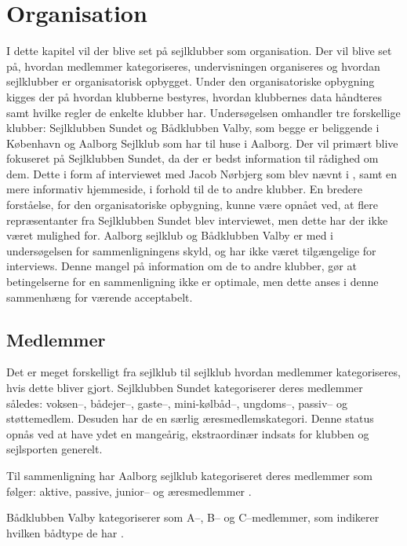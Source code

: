 \chapter{Organisation}\label{chap:organisation}

I dette kapitel vil der blive set på sejlklubber som organisation. Der vil blive set på, hvordan medlemmer
kategoriseres, undervisningen organiseres og hvordan sejlklubber er organisatorisk opbygget. Under den
organisatoriske opbygning kigges der på hvordan klubberne bestyres, hvordan klubbernes data håndteres samt
hvilke regler de enkelte klubber har. 
Undersøgelsen omhandler tre forskellige klubber: Sejlklubben Sundet og Bådklubben Valby, som begge er beliggende i København og Aalborg Sejlklub som har til huse i Aalborg. 
Der vil primært blive fokuseret på Sejlklubben Sundet,
da der er bedst information til rådighed om dem. 
Dette i form af interviewet med Jacob Nørbjerg som blev nævnt i , samt en mere informativ hjemmeside, i forhold til de to
andre klubber. 
En bredere forståelse, for den organisatoriske opbygning, kunne være opnået ved, at flere repræsentanter fra Sejlklubben Sundet blev interviewet, men dette har der ikke været mulighed for.
Aalborg sejlklub og Bådklubben Valby er med i undersøgelsen for sammenligningens skyld, og har
ikke været tilgængelige for interviews. 
Denne mangel på information om de to andre klubber, gør at betingelserne for en sammenligning ikke er optimale, men dette anses i denne sammenhæng for værende acceptabelt. 

\section{Medlemmer}\label{sec:organisation-medlemmer}

Det er meget forskelligt fra sejlklub til sejlklub hvordan medlemmer kategoriseres, hvis dette bliver gjort.
Sejlklubben Sundet kategoriserer deres medlemmer således: voksen--, bådejer--, gaste--, mini-kølbåd--,
ungdoms--, passiv-- og støttemedlem. 
Desuden har de en særlig æresmedlemskategori. Denne status opnås ved at have ydet en mangeårig, ekstraordinær indsats for klubben og sejlsporten generelt.\citep{sundet_vedtaegter}

Til sammenligning har Aalborg sejlklub kategoriseret deres medlemmer som følger: aktive, passive, junior-- og
æresmedlemmer \citep{aalborg_sejlklub_vedtaegter}.

Bådklubben Valby kategoriserer som A--, B-- og C--medlemmer, som indikerer hvilken bådtype de har
\citep{badklubben_valby_love}.

